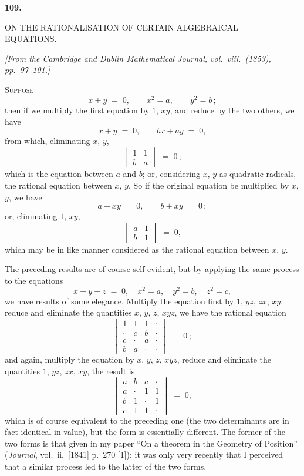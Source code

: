 \documentclass[11pt]{article}
\begin{document}
\begin{center}\textbf{109.}\par\medskip
{\large ON THE RATIONALISATION OF CERTAIN ALGEBRAICAL\\
EQUATIONS.}
\end{center}

\noindent\emph{[From the Cambridge and Dublin Mathematical Journal, vol.\ viii.\ (1853), pp.\ 97--101.]}

\bigskip

\noindent\textsc{Suppose}
\[
x + y \;=\; 0,\qquad x^{2} = a,\qquad y^{2} = b\,;
\]
then if we multiply the first equation by $1$, $xy$, and reduce by the two others, we have
\[
x + y \;=\; 0,\qquad bx + ay \;=\; 0,
\]
from which, eliminating $x$, $y$,
\[
\begin{vmatrix} 1 & 1 \\ b & a \end{vmatrix} \;=\; 0\,;
\]
which is the equation between $a$ and $b$; or, considering $x$, $y$ as quadratic radicals, the rational equation between $x$, $y$. So if the original equation be multiplied by $x$, $y$, we have
\[
a + xy \;=\; 0,\qquad b + xy \;=\; 0\,;
\]
or, eliminating $1$, $xy$,
\[
\begin{vmatrix} a & 1 \\ b & 1 \end{vmatrix} \;=\; 0,
\]
which may be in like manner considered as the rational equation between $x$, $y$.

The preceding results are of course self-evident, but by applying the same process to the equations
\[
x + y + z \;=\; 0,\quad x^{2} = a,\quad y^{2} = b,\quad z^{2} = c,
\]
we have results of some elegance. Multiply the equation first by $1$, $yz$, $zx$, $xy$, reduce and eliminate the quantities $x$, $y$, $z$, $xyz$, we have the rational equation
\[
\begin{vmatrix}
1 & 1 & 1 & \cdot \\
\cdot & c & b & \cdot \\
c & \cdot & a & \cdot \\
b & a & \cdot & \cdot
\end{vmatrix} \;=\; 0\,;
\]
and again, multiply the equation by $x$, $y$, $z$, $xyz$, reduce and eliminate the quantities $1$, $yz$, $zx$, $xy$, the result is
\[
\begin{vmatrix}
a & b & c & \cdot \\
a & \cdot & 1 & 1 \\
b & 1 & \cdot & 1 \\
c & 1 & 1 & \cdot
\end{vmatrix} \;=\; 0,
\]
which is of course equivalent to the preceding one (the two determinants are in fact identical in value), but the form is essentially different. The former of the two forms is that given in my paper ``On a theorem in the Geometry of Position'' (\emph{Journal}, vol.\ ii.\ [1841] p.\ 270 [1]): it was only very recently that I perceived that a similar process led to the latter of the two forms.
\end{document}
